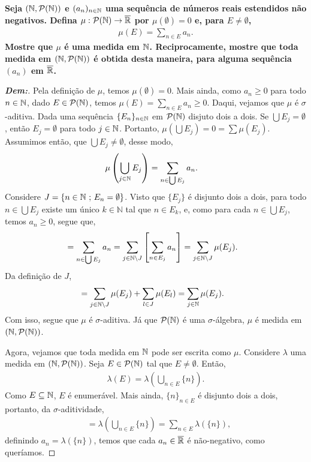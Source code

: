 \biglinend
\newpage 
{}
\myexe{\thedois}
\bigline
\textbf{Seja $(\mathbb N, \mathcal P(\mathbb N))$ e $(a_n)_{n \in \mathbb N}$ uma sequência 
de números reais estendidos não negativos. Defina $\mu: \mathcal P(\mathbb N) \rightarrow \overline {\mathbb R}$
por $\mu(\emptyset) = 0$ e, para $E \neq \emptyset$,
\begin{align*}
  \mu(E) = \sum_{n \in E} a_n.
\end{align*}
Mostre que $\mu$ é uma medida em $\mathbb N$. Reciprocamente, mostre que toda medida 
em $(\mathbb N, \mathcal P(\mathbb N))$ é obtida desta maneira, para alguma sequência 
$(a_n)$ em $\overline {\mathbb R}$.
}
\begin{proof}[\textbf{Dem:}]
  Pela definição de $\mu$, temos $\mu(\emptyset) = 0$. Mais ainda, como $a_n \ge 0$ para todo $n \in \mathbb N$, dado 
  $E \in \mathcal P(\mathbb N)$, temos
  $\mu(E) = \sum_{n \in E} a_n \ge 0$. Daqui, vejamos que $\mu$ é $\sigma$-aditiva. Dada uma sequência 
  $\{E_n\}_{n \in \mathbb N}$ em $\mathcal P(\mathbb N)$ disjuto dois a dois. Se $\bigcup E_j = \emptyset$, então $E_j = \emptyset$ para todo 
  $j \in \mathbb N$. Portanto, $\mu(\bigcup E_j) = 0 = \sum \mu(E_j)$. Assumimos então, que $\bigcup E_j \neq \emptyset$, 
  desse modo,
  \begin{align*}
    \mu\left(\bigcup\limits_{j \in \mathbb N} E_j\right) &= \sum_{n \in \bigcup E_j} a_n.
  \end{align*}
  Considere $J = \{n \in \mathbb N\text{ ; }  E_n = \emptyset\}$. Visto que $\{E_j\}$ é disjunto dois a dois,
  para todo $n \in \bigcup E_j$ existe um único $k \in \mathbb N$ tal que 
  $n \in E_k$, e, como para cada $n \in \bigcup E_j$, temos $a_n \ge 0$, segue que,
  \begin{align*}
    &= \sum_{n \in \bigcup E_j} a_n = \sum_{j \in \mathbb N \setminus J} \left[\sum_{n \in E_j} a_n\right]
    = \sum_{j \in \mathbb N \setminus J} \mu(E_j).
  \end{align*}
  Da definição de $J$, 
\begin{align*}
  &= \sum_{j \in \mathbb N \setminus J} \mu(E_j) + \sum_{l \in J}\mu(E_l) = \sum_{j \in \mathbb N} \mu(E_j).
\end{align*}
  Com isso, segue que $\mu$ é $\sigma$-aditiva. Já que $\mathcal P (\mathbb N)$ é uma $\sigma$-álgebra, $\mu$ é medida em 
  $(\mathbb N, \mathcal P (\mathbb N))$.

  Agora, vejamos que toda medida em $\mathbb N$ pode ser escrita como $\mu$. Considere $\lambda$ 
  uma medida em $(\mathbb N, \mathcal P (\mathbb N))$. Seja $E \in \mathcal P (\mathbb N)$ tal que $E \neq \emptyset$.
  Então, 
  \begin{align*}
    \lambda(E) = \lambda\left(\bigcup\limits_{n \in E} \{n\}\right).
  \end{align*}
  Como $E \subseteq \mathbb N$, $E$ é enumerável. Mais ainda, $\{n\}_{n \in E}$ é disjunto dois a dois, portanto, 
  da $\sigma$-aditividade, 
  \begin{align*}
    &= \lambda\left(\bigcup\limits_{n \in E} \{n\}\right) = \sum_{n \in E} \lambda(\{n\}),
  \end{align*}
  definindo $a_n = \lambda(\{n\})$, temos que cada $a_n \in \overline {\mathbb R}$ é não-negativo, 
  como queríamos.
\end{proof}

